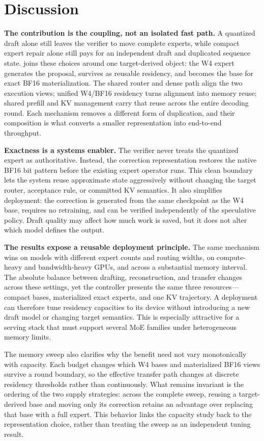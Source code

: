 \section{Discussion}
\label{sec:discussion}

\textbf{The contribution is the coupling, not an isolated fast path.} A quantized
draft alone still leaves the verifier to move complete experts, while compact expert
repair alone still pays for an independent draft and duplicated sequence state.
\system joins these choices around one target-derived object: the W4 expert generates
the proposal, survives as reusable residency, and becomes the base for exact BF16
materialization. The shared router and dense path align the two execution views;
unified W4/BF16 residency turns alignment into memory reuse; shared prefill and KV
management carry that reuse across the entire decoding round. Each mechanism removes
a different form of duplication, and their composition is what converts a smaller
representation into end-to-end throughput.

\textbf{Exactness is a systems enabler.} The verifier never treats the quantized
expert as authoritative. Instead, the correction representation restores the native
BF16 bit pattern before the existing expert operator runs. This clean boundary lets
the system reuse approximate state aggressively without changing the target router,
acceptance rule, or committed KV semantics. It also simplifies deployment: the
correction is generated from the same checkpoint as the W4 base, requires no
retraining, and can be verified independently of the speculative policy. Draft
quality may affect how much work is saved, but it does not alter which model defines
the output.

\textbf{The results expose a reusable deployment principle.} The same mechanism wins
on models with different expert counts and routing widths, on compute-heavy and
bandwidth-heavy GPUs, and across a substantial memory interval. The absolute balance
between drafting, reconstruction, and transfer changes across these settings, yet the
controller presents the same three resources---compact bases, materialized exact
experts, and one KV trajectory. A deployment can therefore tune residency capacities
to its device without introducing a new draft model or changing target semantics.
This is especially attractive for a serving stack that must support several MoE
families under heterogeneous memory limits.

The memory sweep also clarifies why the benefit need not vary monotonically with
capacity. Each budget changes which W4 bases and materialized BF16 views survive a
round boundary, so the effective transfer path changes at discrete residency
thresholds rather than continuously. What remains invariant is the ordering of the
two supply strategies: across the complete sweep, reusing a target-derived base and
moving only its correction retains an advantage over replacing that base with a full
expert. This behavior links the capacity study back to the representation choice,
rather than treating the sweep as an independent tuning result.

